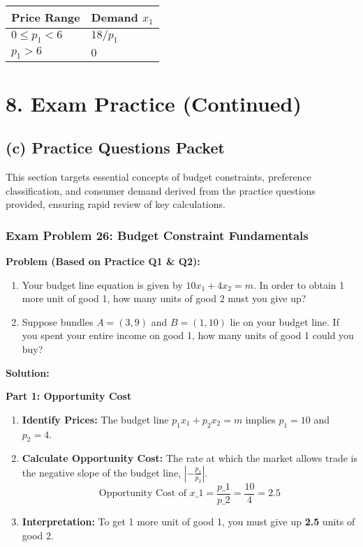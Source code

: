 \documentclass{article}
\begin{document}
\begin{table}[h!]
\centering
\begin{tabular}{ll}
\toprule
\textbf{Price Range} & \textbf{Demand $x_1$} \\
\midrule
$0 \leq p_1 < 6$ & $18/p_1$ \\
$p_1 > 6$ & $0$ \\
\bottomrule

\end{tabular}

\end{table}

\section*{8. Exam Practice (Continued)}

\subsection*{(c) Practice Questions Packet}

This section targets essential concepts of budget constraints, preference classification, and consumer demand derived from the practice questions provided, ensuring rapid review of key calculations.

\subsubsection*{Exam Problem 26: Budget Constraint Fundamentals}

\textbf{Problem (Based on Practice Q1 \& Q2):}
\begin{enumerate}
    \item Your budget line equation is given by $10x_1 + 4x_2 = m$. In order to obtain 1 more unit of good 1, how many units of good 2 must you give up?
    \item Suppose bundles $A=(3, 9)$ and $B=(1, 10)$ lie on your budget line. If you spent your entire income on good 1, how many units of good 1 could you buy?
\end{enumerate}

\textbf{Solution:}

\textbf{Part 1: Opportunity Cost}
\begin{enumerate}
    \item \textbf{Identify Prices:} The budget line $p_1 x_1 + p_2 x_2 = m$ implies $p_1=10$ and $p_2=4$.
    \item \textbf{Calculate Opportunity Cost:} The rate at which the market allows trade is the negative slope of the budget line, $|-\frac{p_1}{p_2}|$.
    \[\text{Opportunity Cost of } x\_1 = \frac{p\_1}{p\_2} = \frac{10}{4} = 2.5\]
    \item \textbf{Interpretation:} To get 1 more unit of good 1, you must give up \textbf{2.5} units of good 2.
\end{enumerate}
\end{document}
